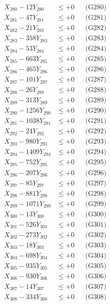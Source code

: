 \documentclass[a4paper,10pt]{article}
\begin{document}
{\begin{align}
X_{280} - 12Y_{280} &\leq +0 && \text{(G280)} \\
\allowbreak
X_{281} - 47Y_{281} &\leq +0 && \text{(G281)} \\
X_{282} - 21Y_{282} &\leq +0 && \text{(G282)} \\
X_{283} - 358Y_{283} &\leq +0 && \text{(G283)} \\
X_{284} - 53Y_{284} &\leq +0 && \text{(G284)} \\
X_{285} - 663Y_{285} &\leq +0 && \text{(G285)} \\
X_{286} - 465Y_{286} &\leq +0 && \text{(G286)} \\
X_{287} - 101Y_{287} &\leq +0 && \text{(G287)} \\
X_{288} - 26Y_{288} &\leq +0 && \text{(G288)} \\
X_{289} - 313Y_{289} &\leq +0 && \text{(G289)} \\
X_{290} - 1256Y_{290} &\leq +0 && \text{(G290)} \\
\allowbreak
X_{291} - 1038Y_{291} &\leq +0 && \text{(G291)} \\
X_{292} - 24Y_{292} &\leq +0 && \text{(G292)} \\
X_{293} - 980Y_{293} &\leq +0 && \text{(G293)} \\
X_{294} - 1409Y_{294} &\leq +0 && \text{(G294)} \\
X_{295} - 752Y_{295} &\leq +0 && \text{(G295)} \\
X_{296} - 207Y_{296} &\leq +0 && \text{(G296)} \\
X_{297} - 85Y_{297} &\leq +0 && \text{(G297)} \\
X_{298} - 881Y_{298} &\leq +0 && \text{(G298)} \\
X_{299} - 1071Y_{299} &\leq +0 && \text{(G299)} \\
X_{300} - 13Y_{300} &\leq +0 && \text{(G300)} \\
\allowbreak
X_{301} - 526Y_{301} &\leq +0 && \text{(G301)} \\
X_{302} - 273Y_{302} &\leq +0 && \text{(G302)} \\
X_{303} - 18Y_{303} &\leq +0 && \text{(G303)} \\
X_{304} - 698Y_{304} &\leq +0 && \text{(G304)} \\
X_{305} - 935Y_{305} &\leq +0 && \text{(G305)} \\
X_{306} - 930Y_{306} &\leq +0 && \text{(G306)} \\
X_{307} - 14Y_{307} &\leq +0 && \text{(G307)} \\
X_{308} - 334Y_{308} &\leq +0 && \text{(G308)} \\

\end{align}}
\end{document}
